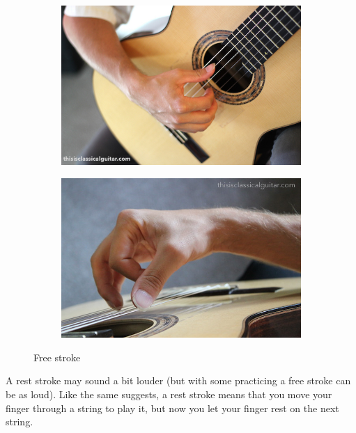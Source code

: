 \begin{figure}[h]
  \begin{subfigure}[b]{0.45\textwidth}
    \includegraphics[width=\textwidth]{image/Bradford-right-hand-close-2016.jpg}
    \caption{}
    \label{fig:}
  \end{subfigure}
  \hfill
  \begin{subfigure}[b]{0.45\textwidth}
    \includegraphics[width=\textwidth]{image/brad-right-stroke-2016.jpg}
    \caption{}
    \label{fig:}
  \end{subfigure}
  \caption{Free stroke \cite{FreeStrokePositionBradlyWerner}}
  \label{fig:free_stoke_hand_position}
\end{figure}

A rest stroke may sound a bit louder (but with some practicing a free stroke can be as loud). Like the same suggests, a rest stroke means that you move your finger through a string to play it, but now you let your finger rest on the next string.

